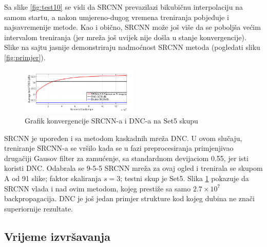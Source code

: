 \documentclass[12pt]{report}
\numberwithin{equation}{section}
\begin{document}
 Sa slike \ref{fig:test10} se vidi da SRCNN prevazilazi bikubičnu interpolaciju na samom startu, a nakon umjereno-dugog vremena treniranja pobjeđuje i najsavremenije metode. Kao i obično, SRCNN može još više da se poboljša većim intervalom treniranja (jer mreža još uvijek nije došla u stanje konvergencije). Slike na sajtu \cite{supp1} jasnije demonstriraju nadmoćnost SRCNN metoda (pogledati sliku \ref{fig:primjer}). 

 \begin{figure}
\vspace{-20pt}  
  \begin{center}
    \includegraphics[width=0.5\textwidth]{SLIKE/figure11}
  \end{center}
  \vspace{-20pt}
  \caption{Grafik konvergencije SRCNN-a i DNC-a na Set5 skupu}
   
  \label{fig:11ogled}
 \vspace{-25pt}
\end{figure}
  SRCNN je upoređen i sa metodom kaskadnih mreža DNC. U ovom slučaju, treniranje SRCNN-a se vršilo kada se u fazi preprocesiranja primjenjivao drugačiji Gausov filter za zamućenje, sa standardnom devijaciom 0.55, jer isti koristi DNC. Odabrala se 9-5-5 SRCNN mreža za ovaj ogled i trenirala se skupom A od 91 slike; faktor skaliranja $s=3$; testni skup je Set5. Slika \ref{fig:11ogled} pokazuje da SRCNN vlada i nad ovim metodom, kojeg prestiže sa samo $2.7 \times 10^7$ backpropagacija. DNC je još jedan primjer strukture kod kojeg dubina ne znači superiornije rezultate.   


  
  \subsection{Vrijeme izvršavanja}
\end{document}
